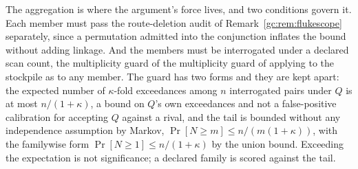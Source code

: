 \noindent The aggregation is where the argument's force lives, and two
conditions govern it. Each member must pass the
route-deletion audit of Remark~\ref{gc:rem:flukescope} separately,
since a permutation admitted into the conjunction inflates the bound
without adding linkage. And the members must be interrogated under a
declared scan count, the multiplicity guard of
the multiplicity guard of \cite{GoldenTargeted} applying to the stockpile as to any member.
The guard has two forms and they are kept apart: the expected number of $\kappa$-fold exceedances among $n$ interrogated pairs under $Q$ is at most $n/(1+\kappa)$, a bound on $Q$'s own exceedances and not a false-positive calibration for accepting $Q$ against a rival, and the tail is bounded without any independence
assumption by Markov, $\Pr[N\ge m]\le n/(m(1+\kappa))$, with the
familywise form $\Pr[N\ge1]\le n/(1+\kappa)$ by the union bound.
Exceeding the expectation is not significance; a declared family is
scored against the tail.


